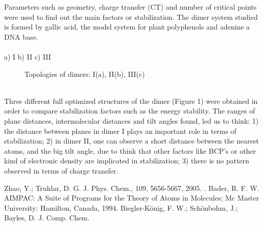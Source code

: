 Parameters such as geometry, charge transfer (CT) and number of critical
points were used to find out the main factors or stabilization. The dimer system
studied is formed by gallic acid, the model system for plant polyphenols and adenine
a DNA base.
\\
\\
a) I\hspace{3.3cm} b) II\hspace{5.5cm} c) III
\begin{figure}[h]
 {}
 {}
 {}
 \caption[]{ Topologies of dimers: I(a), II(b), III(c) }\label{figure 1}
\end{figure}
\\
Three different full optimized structures of the dimer (Figure 1) were obtained
in order to compare stabilization factors such as the energy stability.
The ranges of plane distances, intermolecular distances and tilt angles found,
led us to think: 1) the distance between planes in dimer I plays an important role in
terms of stabilization; 2) in dimer II, one can observe a short distance between the
nearest atoms, and the big tilt angle, due to think that other factors like BCP’s or
other kind of electronic density are implicated in stabilization; 3) there is no pattern
observed in terms of charge transfer.
\newpage
\begin{figure}[h]
 {}
\end{figure}
{\footnotesize
\noindent
[1] Zhao, Y.; Truhlar, D. G. J. Phys. Chem., 109, 5656-5667, 2005.
\newline
[2]. Bader, R. F. W. AIMPAC: A Suite of Programs for the Theory of Atoms in
Molecules; Mc Master University: Hamilton, Canada, 1994.
\newline
[3] Biegler-König, F. W.; Schönbohm, J.; Bayles, D. J. Comp. Chem.
}

\newpage
\setcounter{figure}{0}
